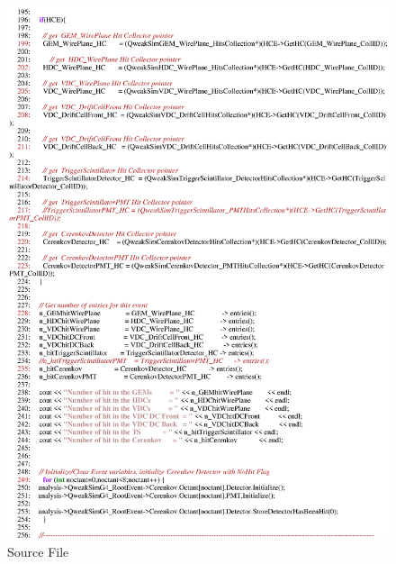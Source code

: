 \begin{figure}[h]
  \hspace{0cm}
  \includegraphics[scale=0.8]{./figures13/QweakSimEventAction.cc-p4.eps}
  \caption{Source File}
           \label{fig:XIII-SC-19}
\end{figure}

\clearpage

